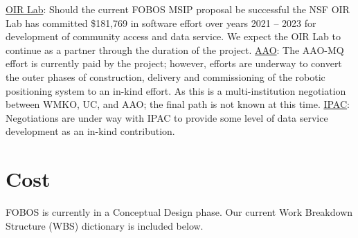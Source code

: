 \documentclass[oneside,11pt]{amsart}
\begin{document}
\underline{OIR Lab}: Should the current FOBOS MSIP proposal be
successful the NSF OIR Lab has committed \$181,769 in software effort
over years 2021 – 2023 for development of community access and data
service. We expect the OIR Lab to continue as a partner through the
duration of the project. \underline{AAO}: The AAO-MQ effort is
currently paid by the project; however, efforts are underway to
convert the outer phases of construction, delivery and commissioning
of the robotic positioning system to an in-kind effort. As this is a
multi-institution negotiation between WMKO, UC, and AAO; the final
path is not known at this time. \underline{IPAC}: Negotiations are
under way with IPAC to provide some level of data service development
as an in-kind contribution.


\section{Cost}
\label{sec:cost}






FOBOS is currently in a Conceptual Design phase. Our current Work
Breakdown Structure (WBS) dictionary is included below.
\end{document}
